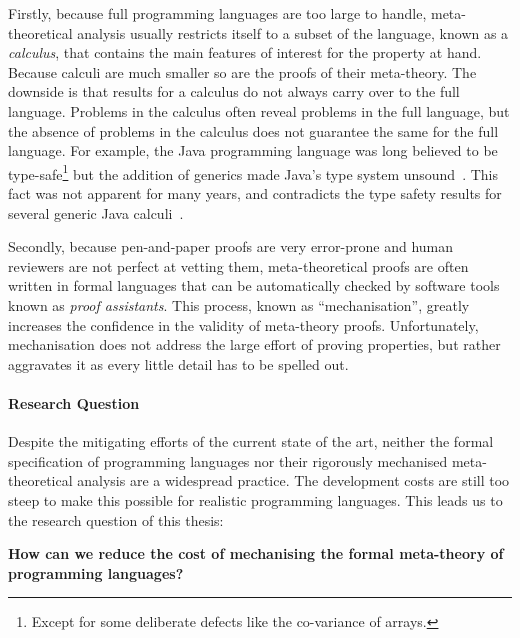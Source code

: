 {Firstly, because full programming languages are too large to handle,
meta-theoretical analysis usually restricts itself to a subset of the language,
known as a \emph{calculus}, that contains the main features of interest for the
property at hand. Because calculi are much smaller so are the proofs of their
meta-theory. The downside is that results for a calculus do not always carry
over to the full language. Problems in the calculus often reveal problems in the
full language, but the absence of problems in the calculus does not guarantee
the same for the full language.  For example, the Java programming language was
long believed to be type-safe\footnote{Except for some deliberate defects like
  the co-variance of arrays.}  but the addition of generics made Java's type
system unsound~\cite{amin2016java}. This fact was not apparent for many years,
and contradicts the type safety results for several generic Java
calculi~\cite{igarashi2001featherweight,Cameron2008}.

Secondly, because pen-and-paper proofs are very error-prone and human reviewers
are not perfect at vetting them, meta-theoretical proofs are often written in
formal languages that can be automatically checked by software tools known as
\emph{proof assistants}. This process, known as ``mechanisation'', greatly
increases the confidence in the validity of meta-theory proofs. Unfortunately,
mechanisation does not address the large effort of proving properties, but
rather aggravates it as every little detail has to be spelled out.

\paragraph{Research Question}
Despite the mitigating efforts of the current state of the art, neither the
formal specification of programming languages nor their rigorously mechanised
meta-theoretical analysis are a widespread practice. The development costs are
still too steep to make this possible for realistic programming languages. This
leads us to the research question of this thesis:
\begin{center}
  \begin{minipage}{0.8\columnwidth}\bf
    How can we reduce the cost of mechanising the formal meta-theory of
    programming languages?
  \end{minipage}
\end{center}

}
